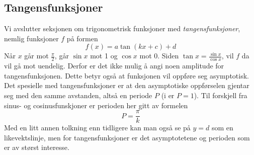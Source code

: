 \subsection{Tangensfunksjoner}
Vi avslutter seksjonen om trigonometrisk funksjoner med \textit{tangensfunksjoner}, nemlig funksjoner $ f $ på formen
\[ f(x)= a\tan(kx+c)+d \]
Når $ x $ går mot $ \frac{\pi}{2}$, går $ \sin x $ mot 1 og $ \cos x $ mot 0. Siden $ {\tan x = \frac{\sin x}{\cos x}} $, vil $ f $ da vil gå mot uendelig. Derfor er det ikke mulig å angi noen amplitude for tangensfunksjonen. Dette betyr også at funksjonen vil oppføre seg asymptotisk.\vs
{}
Det spesielle med tangensfunksjoner er at den asymptotiske oppførselen gjentar seg med den samme avstanden, altså en periode $ P $ (i  er $ {P=1} $). Til forskjell fra  sinus- og cosinusfunskjoner er perioden her gitt av formelen
\[ P=\frac{\pi}{k} \]
Med en litt annen tolkning enn tidligere kan man også se på ${ y=d} $ som en likevektslinje, men for tangensfunksjoner er det asymptotetene og perioden som er av størst interesse. \regv
{}
\newpage
\subsection{\deravtri \label{deravtri}}
\reg[\deravtri]{ \vsb
\begin{align}
	& (\cos x)' = -\sin (x) \label{dercosx} \vn
	& (\sin x)' = \cos (x) \label{dersinx} \vn
	& (\tan x)' =  \frac{1}{\cos^{2}x} =  1+\tan^{2} x \label{dertanx}
\end{align}
}\vsk

